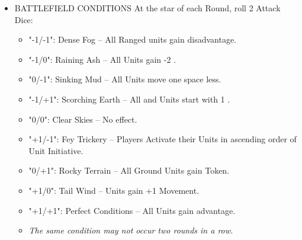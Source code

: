 \begin{multicols*}{2}
\begin{itemize}
  \item \MakeUppercase{Battlefield Conditions} At the star of each Round, roll 2 Attack Dice: %
  \begin{itemize}
    \item "-1/-1": Dense Fog -- All Ranged units gain disadvantage.
    \item "-1/0": Raining Ash -- All  Units gain -2 . %
    \item "0/-1": Sinking Mud -- All  Units move one space less.
    \item "-1/+1": Scorching Earth -- All  and  Units start with 1 . %
    \item "0/0": Clear Skies -- No effect. %
    \item "+1/-1": Fey Trickery -- Players Activate their Units in ascending order of Unit Initiative. %
    \item "0/+1": Rocky Terrain -- All Ground Units gain  Token.
    \item "+1/0": Tail Wind --  Units gain +1 Movement.
    \item "+1/+1": Perfect Conditions -- All  Units gain advantage. %
    \item \textit{The same condition may not occur two rounds in a row.}
  \end{itemize} %
  

\end{itemize}
\end{multicols*}
